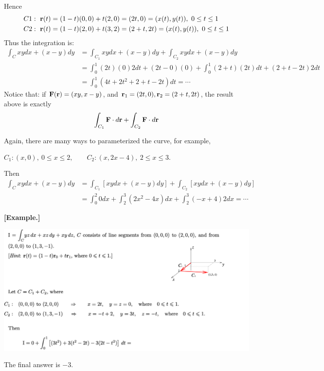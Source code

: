 \documentclass[11pt, a4paper]{MATH2023}
\newcommand{\eg}{\textbf{[Example.] }}
\newcommand{\rr}{{\bf r}}
\newcommand{\FF}{{\bf F}}
\begin{document}
\begin{spacing}{1.3}
    Hence 
    \begin{align*}
        C1: \ \rr(t) &= (1-t)(0, 0) + t(2, 0) = (2t, 0) = (x(t), y(t)),\ 0\le t\le 1\\
        C2: \ \rr(t) &= (1-t)(2, 0) + t(3, 2) = (2+t, 2t) = (x(t), y(t)),\ 0\le t\le 1
    \end{align*}
    Thus the integration is: 
    \begin{align*}
        \int_C xydx+(x-y)dy &= \int_{C_1} xydx+(x-y)dy + \int_{C_2} xydx+(x-y)dy\\
                    &= \int_0^1 (2t)(0) 2dt+(2t-0)(0) +\int_0^1 (2+t)(2t)dt + (2+t-2t) 2dt\\
                    &= \int_0^1 (4t+2t^2+2+t-2t) dt =\cdots
    \end{align*}
    {\blue Notice that: } if $\FF(\rr)=(xy, x-y)$, and $\rr_1=(2t, 0), \rr_2=(2+t,2t)$, 
    the result above is exactly 
    $$\int_{C_1} \FF\cdot d\rr + \int_{C_2} \FF\cdot d\rr$$

    {\blue Again, there are many ways to parameterized the curve, } for example,

    $C_{1}: (x, 0),\  0 \le x \le 2, \qquad C_{2}: (x, 2x-4),\  2 \le x \le 3 .$ 
    
    Then
    \begin{align*}
        \int_{C} x y d x+(x-y) d y 
        &=\int_{C_{1}}[x y d x+(x-y) d y]+\int_{C_{2}}[x y d x+(x-y) d y] \\
        &=\int_{0}^{2} 0 d x+\int_{2}^{3}\left(2 x^{2}-4 x\right) d x+\int_{2}^{3}(-x+4) 2 d x = \cdots
    \end{align*}

    \newpage
    \eg 
    \begin{center}
        \includegraphics[scale=0.52]{images/Ch15-wrt-eg2.png}
    \end{center}
    The final answer is $-3$.


\end{spacing}
\end{document}
